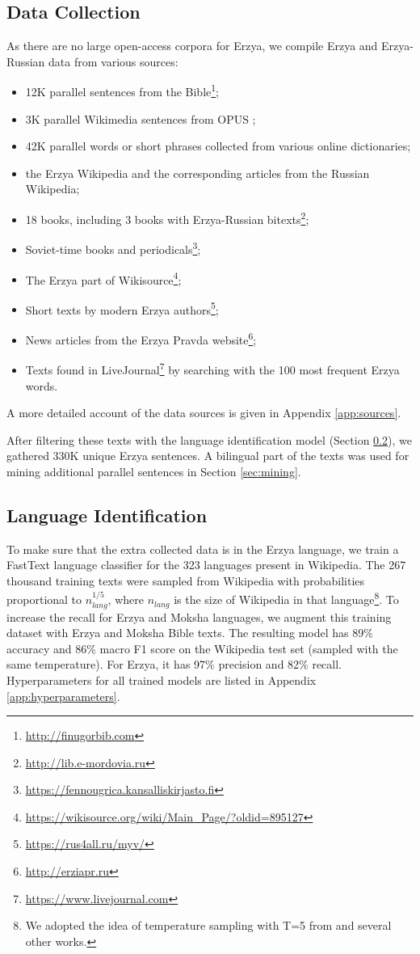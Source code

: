 \documentclass[11pt]{article}
\begin{document}
\subsection{Data Collection}
As there are no large open-access corpora for Erzya, we compile Erzya and Erzya-Russian data from various sources:
\begin{itemize}
    \item  12K parallel sentences from the Bible\footnote{\url{http://finugorbib.com}};
    \item 3K parallel Wikimedia sentences from OPUS \cite{tiedemann-2012-parallel};
    \item 42K parallel words or short phrases collected from various online dictionaries;
    \item the Erzya Wikipedia and the corresponding articles from the Russian Wikipedia;
    \item 18 books, including 3 books with Erzya-Russian bitexts\footnote{\url{http://lib.e-mordovia.ru}};
    \item Soviet-time books and periodicals\footnote{\url{https://fennougrica.kansalliskirjasto.fi}};
    \item The Erzya part of Wikisource\footnote{\url{https://wikisource.org/wiki/Main\_Page/?oldid=895127}};
    \item Short texts by modern Erzya authors\footnote{\url{https://rus4all.ru/myv/}};
    \item News articles from the Erzya Pravda website\footnote{\url{http://erziapr.ru}};
    \item Texts found in LiveJournal\footnote{\url{https://www.livejournal.com}} by searching with the 100 most frequent Erzya words.
\end{itemize}
A more detailed account of the data sources is given in Appendix \ref{app:sources}.

After filtering these texts with the language identification model (Section \ref{sec:langid}), we gathered 330K unique Erzya sentences. A bilingual part of the texts was used for mining additional parallel sentences in Section \ref{sec:mining}.

\subsection{Language Identification}
\label{sec:langid}
To make sure that the extra collected data is in the Erzya language, we train a FastText \cite{joulin2016bag} language classifier for the 323 languages present in Wikipedia. The 267 thousand training texts were sampled from Wikipedia with probabilities proportional to $n_{lang}^{1/5}$, where $n_{lang}$ is the size of Wikipedia in that language\footnote{We adopted the idea of temperature sampling
with T=5 from \citet{tran-etal-2021-facebook} and several other works.}. To increase the recall for Erzya and Moksha languages, we augment this training dataset with Erzya and Moksha Bible texts. The resulting model 
has 89\% accuracy and 86\% macro F1 score on the Wikipedia test set (sampled with the same temperature). For Erzya, it has 97\% precision and 82\% recall. Hyperparameters for all trained models are listed in Appendix \ref{app:hyperparameters}.
\end{document}
